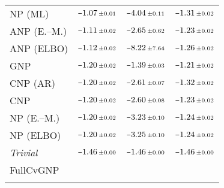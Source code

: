 \begin{tabular}[t]{lccc}
NP (ML) & $\scalebox{0.7}[1]{$-$}1.07\,{ \scriptstyle \pm  0.01 }$ & $\scalebox{0.7}[1]{$-$}4.04\,{ \scriptstyle \pm  0.11 }$ & $\scalebox{0.7}[1]{$-$}1.31\,{ \scriptstyle \pm  0.02 }$ \\ 
ANP (E.--M.) & $\scalebox{0.7}[1]{$-$}1.11\,{ \scriptstyle \pm  0.02 }$ & $\scalebox{0.7}[1]{$-$}2.65\,{ \scriptstyle \pm  0.62 }$ & $\scalebox{0.7}[1]{$-$}1.23\,{ \scriptstyle \pm  0.02 }$ \\ 
ANP (ELBO) & $\scalebox{0.7}[1]{$-$}1.12\,{ \scriptstyle \pm  0.02 }$ & $\scalebox{0.7}[1]{$-$}8.22\,{ \scriptstyle \pm  7.64 }$ & $\scalebox{0.7}[1]{$-$}1.26\,{ \scriptstyle \pm  0.02 }$ \\ 
GNP & $\scalebox{0.7}[1]{$-$}1.20\,{ \scriptstyle \pm  0.02 }$ & $\scalebox{0.7}[1]{$-$}1.39\,{ \scriptstyle \pm  0.03 }$ & $\scalebox{0.7}[1]{$-$}1.21\,{ \scriptstyle \pm  0.02 }$ \\ 
CNP (AR) & $\scalebox{0.7}[1]{$-$}1.20\,{ \scriptstyle \pm  0.02 }$ & $\scalebox{0.7}[1]{$-$}2.61\,{ \scriptstyle \pm  0.07 }$ & $\scalebox{0.7}[1]{$-$}1.32\,{ \scriptstyle \pm  0.02 }$ \\ 
CNP & $\scalebox{0.7}[1]{$-$}1.20\,{ \scriptstyle \pm  0.02 }$ & $\scalebox{0.7}[1]{$-$}2.60\,{ \scriptstyle \pm  0.08 }$ & $\scalebox{0.7}[1]{$-$}1.23\,{ \scriptstyle \pm  0.02 }$ \\ 
NP (E.--M.) & $\scalebox{0.7}[1]{$-$}1.20\,{ \scriptstyle \pm  0.02 }$ & $\scalebox{0.7}[1]{$-$}3.23\,{ \scriptstyle \pm  0.10 }$ & $\scalebox{0.7}[1]{$-$}1.24\,{ \scriptstyle \pm  0.02 }$ \\ 
NP (ELBO) & $\scalebox{0.7}[1]{$-$}1.20\,{ \scriptstyle \pm  0.02 }$ & $\scalebox{0.7}[1]{$-$}3.25\,{ \scriptstyle \pm  0.10 }$ & $\scalebox{0.7}[1]{$-$}1.24\,{ \scriptstyle \pm  0.02 }$ \\ 
{\normalshape \textit{Trivial}} & $\scalebox{0.7}[1]{$-$}1.46\,{ \scriptstyle \pm  0.00 }$ & $\scalebox{0.7}[1]{$-$}1.46\,{ \scriptstyle \pm  0.00 }$ & $\scalebox{0.7}[1]{$-$}1.46\,{ \scriptstyle \pm  0.00 }$ \\ 
FullCvGNP &  &  &  \\ 
\bottomrule \\ 
\end{tabular} 
